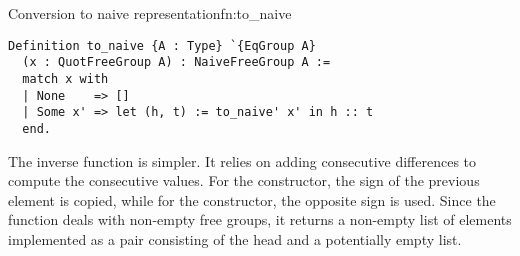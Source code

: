\begin{func}{Conversion to naive representation}{fn:to_naive}
\begin{verbatim}
Definition to_naive {A : Type} `{EqGroup A} 
  (x : QuotFreeGroup A) : NaiveFreeGroup A :=
  match x with
  | None    => []
  | Some x' => let (h, t) := to_naive' x' in h :: t
  end.
\end{verbatim}
\end{func}
The inverse function  is simpler. It relies on adding consecutive differences to compute the consecutive values. For the  constructor, the sign of the previous element is copied, while for the  constructor, the opposite sign is used. Since the  function deals with non-empty free groups, it returns a non-empty list of elements implemented as a pair consisting of the head and a potentially empty list.


